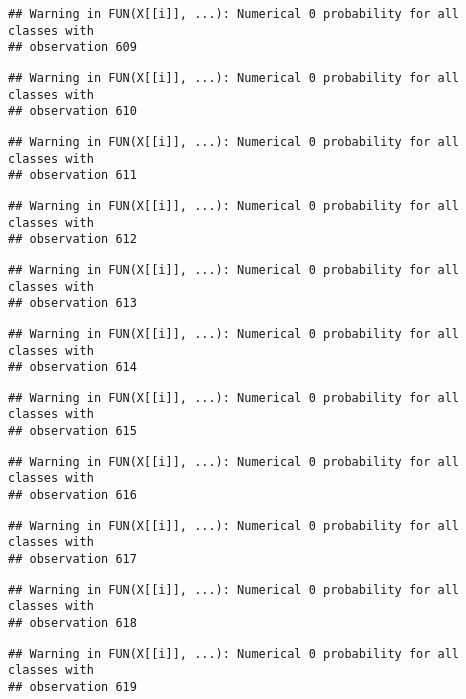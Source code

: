 \documentclass[
]{article}
\begin{document}
\begin{verbatim}
## Warning in FUN(X[[i]], ...): Numerical 0 probability for all classes with
## observation 609
\end{verbatim}

\begin{verbatim}
## Warning in FUN(X[[i]], ...): Numerical 0 probability for all classes with
## observation 610
\end{verbatim}

\begin{verbatim}
## Warning in FUN(X[[i]], ...): Numerical 0 probability for all classes with
## observation 611
\end{verbatim}

\begin{verbatim}
## Warning in FUN(X[[i]], ...): Numerical 0 probability for all classes with
## observation 612
\end{verbatim}

\begin{verbatim}
## Warning in FUN(X[[i]], ...): Numerical 0 probability for all classes with
## observation 613
\end{verbatim}

\begin{verbatim}
## Warning in FUN(X[[i]], ...): Numerical 0 probability for all classes with
## observation 614
\end{verbatim}

\begin{verbatim}
## Warning in FUN(X[[i]], ...): Numerical 0 probability for all classes with
## observation 615
\end{verbatim}

\begin{verbatim}
## Warning in FUN(X[[i]], ...): Numerical 0 probability for all classes with
## observation 616
\end{verbatim}

\begin{verbatim}
## Warning in FUN(X[[i]], ...): Numerical 0 probability for all classes with
## observation 617
\end{verbatim}

\begin{verbatim}
## Warning in FUN(X[[i]], ...): Numerical 0 probability for all classes with
## observation 618
\end{verbatim}

\begin{verbatim}
## Warning in FUN(X[[i]], ...): Numerical 0 probability for all classes with
## observation 619
\end{verbatim}
\end{document}
